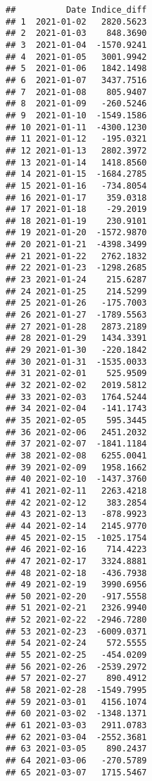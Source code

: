 \documentclass[
]{article}
\newenvironment{Shaded}{\begin{snugshade}}{\end{snugshade}}
\newcommand{\AttributeTok}[1]{\textcolor[rgb]{0.13,0.29,0.53}{#1}}
\newcommand{\DecValTok}[1]{\textcolor[rgb]{0.00,0.00,0.81}{#1}}
\newcommand{\FunctionTok}[1]{\textcolor[rgb]{0.13,0.29,0.53}{\textbf{#1}}}
\newcommand{\NormalTok}[1]{#1}
\newcommand{\OtherTok}[1]{\textcolor[rgb]{0.56,0.35,0.01}{#1}}
\newcommand{\SpecialCharTok}[1]{\textcolor[rgb]{0.81,0.36,0.00}{\textbf{#1}}}
\begin{document}
\begin{Shaded}
\end{Shaded}

\begin{verbatim}
##          Date Indice_diff
## 1  2021-01-02   2820.5623
## 2  2021-01-03    848.3690
## 3  2021-01-04  -1570.9241
## 4  2021-01-05   3001.9942
## 5  2021-01-06   1842.1498
## 6  2021-01-07   3437.7516
## 7  2021-01-08    805.9407
## 8  2021-01-09   -260.5246
## 9  2021-01-10  -1549.1586
## 10 2021-01-11  -4300.1230
## 11 2021-01-12   -195.0321
## 12 2021-01-13   2802.3972
## 13 2021-01-14   1418.8560
## 14 2021-01-15  -1684.2785
## 15 2021-01-16   -734.8054
## 16 2021-01-17    359.0318
## 17 2021-01-18    -29.2019
## 18 2021-01-19    230.9101
## 19 2021-01-20  -1572.9870
## 20 2021-01-21  -4398.3499
## 21 2021-01-22   2762.1832
## 22 2021-01-23  -1298.2685
## 23 2021-01-24    215.6287
## 24 2021-01-25    214.5299
## 25 2021-01-26   -175.7003
## 26 2021-01-27  -1789.5563
## 27 2021-01-28   2873.2189
## 28 2021-01-29   1434.3391
## 29 2021-01-30   -220.1842
## 30 2021-01-31  -1535.0033
## 31 2021-02-01    525.9509
## 32 2021-02-02   2019.5812
## 33 2021-02-03   1764.5244
## 34 2021-02-04   -141.1743
## 35 2021-02-05    595.3445
## 36 2021-02-06   2451.2032
## 37 2021-02-07  -1841.1184
## 38 2021-02-08   6255.0041
## 39 2021-02-09   1958.1662
## 40 2021-02-10  -1437.3760
## 41 2021-02-11   2263.4218
## 42 2021-02-12    383.2854
## 43 2021-02-13   -878.9923
## 44 2021-02-14   2145.9770
## 45 2021-02-15  -1025.1754
## 46 2021-02-16    714.4223
## 47 2021-02-17   3324.8881
## 48 2021-02-18   -436.7938
## 49 2021-02-19   3990.6956
## 50 2021-02-20   -917.5558
## 51 2021-02-21   2326.9940
## 52 2021-02-22  -2946.7280
## 53 2021-02-23  -6009.0371
## 54 2021-02-24    572.5555
## 55 2021-02-25   -454.0209
## 56 2021-02-26  -2539.2972
## 57 2021-02-27    890.4912
## 58 2021-02-28  -1549.7995
## 59 2021-03-01   4156.1074
## 60 2021-03-02  -1348.1371
## 61 2021-03-03   2911.0783
## 62 2021-03-04  -2552.3681
## 63 2021-03-05    890.2437
## 64 2021-03-06   -270.5789
## 65 2021-03-07   1715.5467

\end{verbatim}
\end{document}
